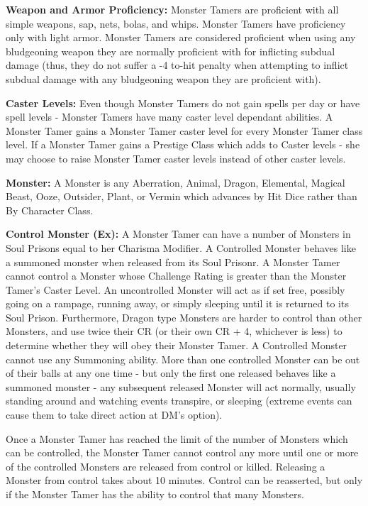 \classfeatures

\textbf{Weapon and Armor Proficiency:} Monster Tamers are proficient with all simple weapons, sap, nets, bolas, and whips. Monster Tamers have proficiency only with light armor. Monster Tamers are considered proficient when using any bludgeoning weapon they are normally proficient with for inflicting subdual damage (thus, they do not suffer a -4 to-hit penalty when attempting to inflict subdual damage with any bludgeoning weapon they are proficient with).

\textbf{Caster Levels:} Even though Monster Tamers do not gain spells per day or have spell levels - Monster Tamers have many caster level dependant abilities. A Monster Tamer gains a Monster Tamer caster level for every Monster Tamer class level. If a Monster Tamer gains a Prestige Class which adds to Caster levels - she may choose to raise Monster Tamer caster levels instead of other caster levels.

\textbf{Monster:} A Monster is any Aberration, Animal, Dragon, Elemental, Magical Beast, Ooze, Outsider, Plant, or Vermin which advances by Hit Dice rather than By Character Class.

\textbf{Control Monster (Ex):} A Monster Tamer can have a number of Monsters in Soul Prisons equal to her Charisma Modifier. A Controlled Monster behaves like a summoned monster when released from its Soul Prisonr. A Monster Tamer cannot control a Monster whose Challenge Rating is greater than the Monster Tamer's Caster Level.
An uncontrolled Monster will act as if set free, possibly going on a rampage, running away, or simply sleeping until it is returned to its Soul Prison. 
Furthermore, Dragon type Monsters are harder to control than other Monsters, and use twice their CR (or their own CR + 4, whichever is less) to determine whether they will obey their Monster Tamer. A Controlled Monster cannot use any Summoning ability. More than one controlled Monster can be out of their balls at any one time - but only the first one released behaves like a summoned monster - any subsequent released Monster will act normally, usually standing around and watching events transpire, or sleeping (extreme events can cause them to take direct action at DM's option).

Once a Monster Tamer has reached the limit of the number of Monsters which can be controlled, the Monster Tamer cannot control any more until one or more of the controlled Monsters are released from control or killed. Releasing a Monster from control takes about 10 minutes. Control can be reasserted, but only if the Monster Tamer has the ability to control that many Monsters.

